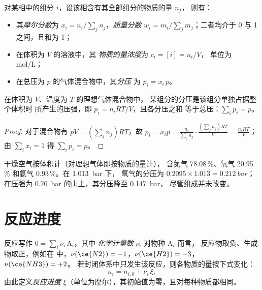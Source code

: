 \begin{definition}[组成变量]\label{def:b1:extent-q-and-k:composition}
对某相中的组分 $i$，设该相含有其全部组分的物质的量 $n_j$，
则有：
\begin{itemize}
  \item 其\emph{摩尔分数}为 $x_i = n_i/\sum_j
        n_j$，\emph{质量分数} $w_i =
        m_i/\sum_j m_j$；二者均介于 0 与 1 之间，且和为 1；
  \item 在体积为 $V$ 的溶液中，其
        \emph{物质的量浓度}为 $c_i = [i] = n_i/V$，
        单位为 \unit{mol/L}；
  \item 在总压为 $p$ 的气体混合物中，其\emph{分压}
        为 $p_i = x_i\,p$。
\end{itemize}
\end{definition}

\begin{proposition}[理想气体的分压]\label{prop:b1:extent-q-and-k:dalton}
在体积为 $V$、温度为 $T$ 的理想气体混合物中，
某组分的分压是该组分单独占据整个体积时
所产生的压强，即 $p_i = n_iRT/V$，且各分压之和
等于总压：$\sum_i p_i = p$。
\end{proposition}

\begin{proof}
对于混合物有 $pV = (\sum_j n_j)RT$，故 $p_i = x_i p = \frac{n_i}{\sum_j
n_j}\cdot\frac{(\sum_j n_j)RT}{V} = \frac{n_iRT}{V}$；由 $\sum_i x_i = 1$
得 $\sum_i p_i = p$。
\end{proof}

\begin{example}[空气]\label{ex:b1:extent-q-and-k:air}
干燥空气按体积计（对理想气体即按物质的量计），
含氮气 78.08\,\%、氧气 20.95\,\% 和氩气 0.93\,\%。在 \qty{1.013}{bar} 下，
氧气的分压为 $0.2095 \times
1.013 = \qty{0.212}{bar}$；在压强为
\qty{0.70}{bar} 的山上，其分压降至 \qty{0.147}{bar}，
尽管组成并未改变。
\end{example}

\section{反应进度}

\begin{definition}[化学计量数与反应进度]\label{def:b1:extent-q-and-k:extent}
反应写作 $0 = \sum_i \nu_i\,\mathrm{A}_i$，其中
\emph{化学计量数} $\nu_i$ 对物种 $\mathrm{A}_i$ 而言，
反应物取负、生成物取正，例如在
 中，$\nu(\ce{N2}) = -1$，$\nu(\ce{H2}) = -3$，
$\nu(\ce{NH3}) = +2$。
若封闭体系中只发生该反应，则各物质的量按下式变化：
\[
  n_i = n_{i,0} + \nu_i\,\xi ,
\]
由此定义\emph{反应进度}
$\xi$（单位为摩尔），其初始值为零，且对每种物质都相同。
\end{definition}

